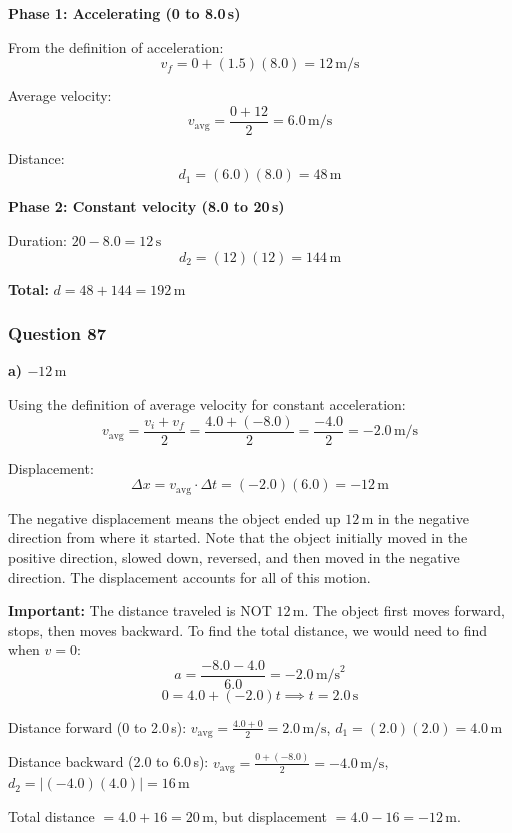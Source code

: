 \documentclass[12pt,letterpaper]{article}
\begin{document}
\begin{explanationbox}
\textbf{Phase 1: Accelerating (0 to 8.0\,s)}

From the definition of acceleration:
\[
v_f = 0 + (1.5)(8.0) = 12\,\text{m/s}
\]

Average velocity:
\[
v_{\text{avg}} = \frac{0 + 12}{2} = 6.0\,\text{m/s}
\]

Distance:
\[
d_1 = (6.0)(8.0) = 48\,\text{m}
\]

\textbf{Phase 2: Constant velocity (8.0 to 20\,s)}

Duration: $20 - 8.0 = 12\,\text{s}$
\[
d_2 = (12)(12) = 144\,\text{m}
\]

\textbf{Total:} $d = 48 + 144 = 192\,\text{m}$
\end{explanationbox}

\subsubsection*{Question 87}

\begin{answerbox}
\textbf{a) $-12\,\text{m}$}
\end{answerbox}

\begin{explanationbox}
Using the definition of average velocity for constant acceleration:
\[
v_{\text{avg}} = \frac{v_i + v_f}{2} = \frac{4.0 + (-8.0)}{2} = \frac{-4.0}{2} = -2.0\,\text{m/s}
\]

Displacement:
\[
\Delta x = v_{\text{avg}} \cdot \Delta t = (-2.0)(6.0) = -12\,\text{m}
\]

The negative displacement means the object ended up $12\,\text{m}$ in the negative direction from
where it started. Note that the object initially moved in the positive direction, slowed down, reversed, and then moved in the negative direction. The displacement accounts for all of this motion.

\textbf{Important:} The distance traveled is NOT $12\,\text{m}$. The object first moves forward, stops, then moves backward. To find the total distance, we would need to find when $v = 0$:
\[
a = \frac{-8.0 - 4.0}{6.0} = -2.0\,\text{m/s}^2
\]
\[
0 = 4.0 + (-2.0)t \implies t = 2.0\,\text{s}
\]

Distance forward (0 to 2.0\,s): $v_{\text{avg}} = \frac{4.0+0}{2} = 2.0\,\text{m/s}$, $d_1 = (2.0)(2.0) = 4.0\,\text{m}$

Distance backward (2.0 to 6.0\,s): $v_{\text{avg}} = \frac{0+(-8.0)}{2} = -4.0\,\text{m/s}$, $d_2 = |(-4.0)(4.0)| = 16\,\text{m}$

Total distance $= 4.0 + 16 = 20\,\text{m}$, but displacement $= 4.0 - 16 = -12\,\text{m}$.
\end{explanationbox}
\end{document}

